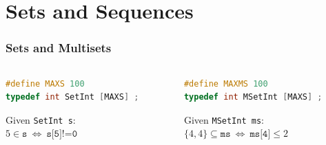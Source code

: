 \documentclass[aspectratio=169]{beamer}
\begin{document}
\section{Sets and Sequences}

\begin{frame}[fragile]\frametitle{Sets and Multisets}
  
\begin{columns}
\begin{column}{.48\textwidth}
\begin{lstlisting}[language=C++,emph={SetInt,MSetInt}]
#define MAXS 100
typedef int SetInt [MAXS] ;
\end{lstlisting}

Given \texttt{SetInt s}:
\\$5 \in \texttt{s} ~\Leftrightarrow~ \texttt{s[5]!=0}$
\end{column}
\begin{column}{.48\textwidth}
\begin{lstlisting}[language=C++,emph={SetInt,MSetInt}]
#define MAXMS 100
typedef int MSetInt [MAXS] ;
\end{lstlisting}

Given \texttt{MSetInt ms}:
\\$\{4,4\} \subseteq \texttt{ms} ~\Leftrightarrow~ \texttt{ms[4]}\leq 2$
\end{column}
\end{columns}

\end{frame}
\end{document}
